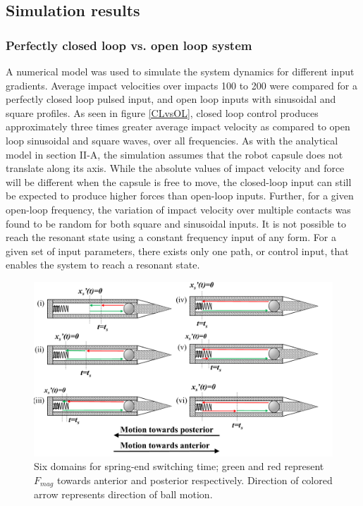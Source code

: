 \documentclass[letterpaper, 10 pt, conference]{ieeeconf}  %
\begin{document}
\subsection{Simulation results}

\subsubsection{Perfectly closed loop vs. open loop system}
\label{clol}

A numerical model was used to simulate the system dynamics for different input gradients. Average impact velocities over impacts 100 to 200 were compared for a perfectly closed loop pulsed input, and open loop inputs with sinusoidal and square profiles. As seen in figure \ref{CLvsOL}, closed loop control produces approximately three times greater average impact velocity as compared to open loop sinusoidal and square waves, over all frequencies. As with the analytical model in section II-A, the simulation assumes that the robot capsule does not translate along its axis. While the absolute values of impact velocity and force will be different when the capsule is free to move, the closed-loop input can still be expected to produce higher forces than open-loop inputs. Further, for a given open-loop frequency, the variation of impact velocity over multiple contacts was found to be random for both square and sinusoidal inputs. It is not possible to reach the resonant state using a constant frequency input of any form. For a given set of input parameters, there exists only one path, or control input, that enables the system to reach a resonant state. 
\begin{figure}
	\includegraphics[width=\linewidth]{Tswitchcases.pdf}
	\caption{Six domains for spring-end switching time; green and red represent $F_{mag}$ towards anterior and posterior respectively. Direction of colored arrow represents direction of ball motion.}
	\label{Tswitch}
\end{figure}
\end{document}
